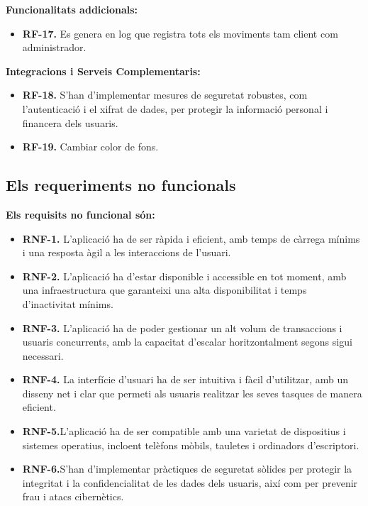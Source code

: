 \documentclass[a4paper,12pt,twoside]{ThesisStyle}
\begin{document}
\textbf{Funcionalitats addicionals:}
\begin{itemize}
    \item \textbf{RF-17.} Es genera en log que registra tots els moviments tam client com administrador.
\end{itemize}


\textbf{Integracions i Serveis Complementaris:}
\begin{itemize}
        \item \textbf{RF-18.} S'han d'implementar mesures de seguretat robustes, com l'autenticació i el xifrat de dades, per protegir la informació personal i financera dels usuaris.
        \item \textbf{RF-19.} Cambiar color de fons.
\end{itemize}


\subsection{Els requeriments no funcionals }
\label{subsec:Els requeriments no funcionals }

\textbf{Els requisits no funcional són:}
\begin{itemize}
    \item \textbf{RNF-1.} L'aplicació ha de ser ràpida i eficient, amb temps de càrrega mínims i una resposta àgil a les interaccions de l'usuari.
    \item \textbf{RNF-2.} L'aplicació ha d'estar disponible i accessible en tot moment, amb una infraestructura que garanteixi una alta disponibilitat i temps d'inactivitat mínims.
    \item \textbf{RNF-3.} L'aplicació ha de poder gestionar un alt volum de transaccions i usuaris concurrents, amb la capacitat d'escalar horitzontalment segons sigui necessari.
    \item \textbf{RNF-4.} La interfície d'usuari ha de ser intuitiva i fàcil d'utilitzar, amb un disseny net i clar que permeti als usuaris realitzar les seves tasques de manera eficient.
    \item \textbf{RNF-5.}L'aplicació ha de ser compatible amb una varietat de dispositius i sistemes operatius, incloent telèfons mòbils, tauletes i ordinadors d'escriptori.
    \item \textbf{RNF-6.}S'han d'implementar pràctiques de seguretat sòlides per protegir la integritat i la confidencialitat de les dades dels usuaris, així com per prevenir frau i atacs cibernètics.
\end{itemize}
\end{document}
